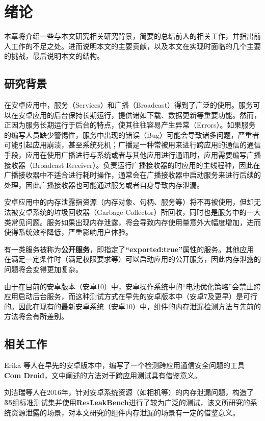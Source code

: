 \chapter{绪论}\label{chapter_introduction}

本章将介绍一些与本文研究相关研究背景，简要的总结前人的相关工作，并指出前人工作的不足之处。进而说明本文的主要贡献，以及本文在实现时面临的几个主要的挑战，最后说明本文的结构。
\section{研究背景}
在安卓应用中，服务（Services）和广播（Broadcast）得到了广泛的使用。服务可以在安卓应用的后台保持长期运行，提供诸如下载、数据更新等重要功能。然而，正因为服务长期运行于后台的特点，使其往往容易产生异常（Errors）。如果服务的编写人员缺少警惕性，服务中出现的错误（Bug）可能会导致诸多问题，严重者可能引起应用崩溃，甚至系统死机；广播是一种常被用来进行跨应用的通信的通信手段，应用在使用广播进行与系统或者与其他应用进行通讯时，应用需要编写广播接收器（Broadcast Receiver）。负责运行广播接收器的时应用的主线程种，因此在广播接收器中不适合进行耗时操作，通常会在广播接收器中启动服务来进行后续的处理，因此广播接收器也可能通过服务或者自身导致内存泄漏。

安卓应用中的内存泄露指资源（内存对象、句柄、服务等）将不再被使用，但却无法被安卓系统的垃圾回收器（Garbage Collector）所回收，同时也是服务中的一大类常见问题。服务如果出现内存泄露，将会导致内存使用量意外大幅度增加，进而使得系统效率降低，严重影响用户体验。

有一类服务被称为\textbf{公开服务}，即指定了\textbf{“exported:true”}属性的服务。其他应用在满足一定条件时（满足权限要求等）可以启动应用的公开服务，因此内存泄露的问题将会变得更加复杂。

由于在目前的安卓版本（安卓10）中，安卓操作系统中的“电池优化策略”\cite{pms}会禁止跨应用启动后台服务\cite{android-service-limit}，而这种测试方式在早先的安卓版本中（安卓7及更早）是可行的。因此在现有的最新安卓系统（安卓10）中，组件的内存泄漏检测方法与先前的方法\cite{jun2018lesdroid}将会有所差别。

\section{相关工作}

Erika 等人在早先的安卓版本中，编写了一个检测跨应用通信安全问题的工具\textbf{Com Droid}\cite{chin2011analyzing}，文中阐述的方法对于跨应用测试具有借鉴意义。
\newline

刘洁瑞等人在2016年，针对安卓系统资源（如相机等）的内存泄漏问题，构造了\textbf{35}组标准测试集并使用\textbf{ResLeakBench}\cite{liu2016}进行了较为广泛的测试，该文所研究的系统资源泄露的场景，对本文研究的组件内存泄漏的场景有一定的借鉴意义。
\newline

